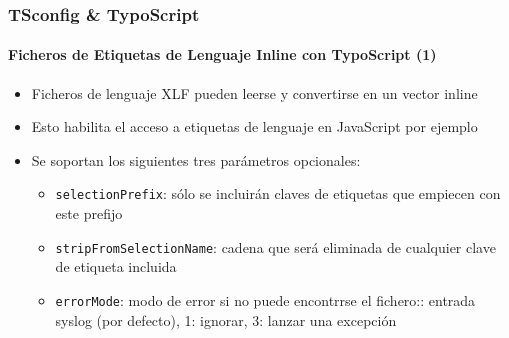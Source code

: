\begin{frame}[fragile]
	\frametitle{TSconfig \& TypoScript}
	\framesubtitle{Ficheros de Etiquetas de Lenguaje Inline con TypoScript (1)}

	\lstset{basicstyle=\tiny\ttfamily}

	\begin{itemize}

		\item Ficheros de lenguaje XLF pueden leerse y convertirse en un vector inline

		\item Esto habilita el acceso a etiquetas de lenguaje en JavaScript por ejemplo

		\item Se soportan los siguientes tres parámetros opcionales:

			\begin{itemize}
				\item \texttt{selectionPrefix}:\newline
					sólo se incluirán claves de etiquetas que empiecen con este prefijo
				\item \texttt{stripFromSelectionName}:\newline
					cadena que será eliminada de cualquier clave de etiqueta incluida
				\item \texttt{errorMode}:\newline
					modo de error si no puede encontrrse el fichero:: entrada syslog (por defecto), 1: ignorar, 3: lanzar una excepción
			\end{itemize}

	\end{itemize}

\end{frame}

